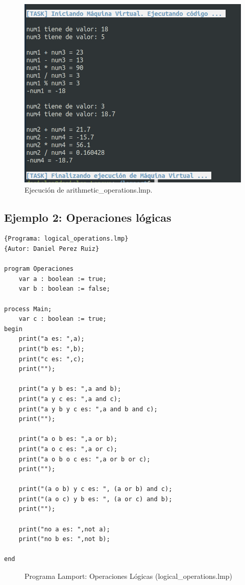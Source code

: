 \newpage
\begin{figure}[h]
    \includegraphics[width=\linewidth]{images/ejemplos/arithmeticOperations.png}
    \caption{Ejecución de arithmetic\_operations.lmp.}
    \label{fig:lamportArithmeticOperations_exec}
\end{figure}

\newpage
\subsection{Ejemplo 2: Operaciones lógicas}
\begin{lstlisting}[style=lamportStyle]
{Programa: logical_operations.lmp}
{Autor: Daniel Perez Ruiz}

program Operaciones
	var a : boolean := true;
	var b : boolean := false;

process Main;
	var c : boolean := true;
begin
	print("a es: ",a);
	print("b es: ",b);
	print("c es: ",c);
	print("");
	
	print("a y b es: ",a and b);
	print("a y c es: ",a and c);
	print("a y b y c es: ",a and b and c);
	print("");
	
	print("a o b es: ",a or b);
	print("a o c es: ",a or c);
	print("a o b o c es: ",a or b or c);
	print("");
	
	print("(a o b) y c es: ", (a or b) and c);
	print("(a o c) y b es: ", (a or c) and b);
	print("");
	
	print("no a es: ",not a);
	print("no b es: ",not b);
	
end
\end{lstlisting}
\begin{figure}[h]
\caption{Programa Lamport: Operaciones Lógicas (logical\_operations.lmp)}
\label{fig:lamportLogicalOperations}
\end{figure}

